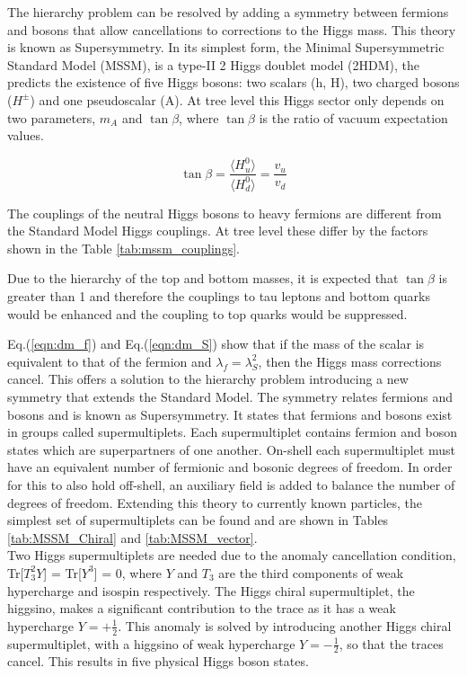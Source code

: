 The hierarchy problem can be resolved by adding a symmetry between fermions and bosons that allow cancellations to corrections to the Higgs mass. This theory is known as Supersymmetry. \cite{SUSY_Primer} In its simplest form, the Minimal Supersymmetric Standard Model (MSSM), is a type-II 2 Higgs doublet model (2HDM), the predicts the existence of five Higgs bosons: two scalars (h, H), two charged bosons (\(H^{\pm}\)) and one pseudoscalar (A). At tree level this Higgs sector only depends on two parameters, $m_A$ and $\tan\beta$, where $\tan\beta$ is the ratio of vacuum expectation values.

\begin{equation}
\tan \beta = \frac{\langle H_{u}^{0} \rangle}{\langle H_{d}^{0} \rangle} = \frac{v_{u}}{v_{d}}
\end{equation}

The couplings of the neutral Higgs bosons to heavy fermions are different from the Standard Model Higgs couplings. At tree level these differ by the factors shown in the Table \ref{tab:mssm_couplings}.


Due to the hierarchy of the top and bottom masses, it is expected that $\tan\beta$ is greater than 1 and therefore the couplings to tau leptons and bottom quarks would be enhanced and the coupling to top quarks would be suppressed.

Eq.(\ref{eqn:dm_f}) and Eq.(\ref{eqn:dm_S}) show that if the mass of the scalar is equivalent to that of the fermion and \(\lambda_f = \lambda_{S}^{2}\), then the Higgs mass corrections cancel. This offers a solution to the hierarchy problem introducing a new symmetry that extends the Standard Model. The symmetry relates fermions and bosons and is known as Supersymmetry. It states that fermions and bosons exist in groups called supermultiplets. Each supermultiplet contains fermion and boson states which are superpartners of one another. On-shell each supermultiplet must have an equivalent number of fermionic and bosonic degrees of freedom. In order for this to also hold off-shell, an auxiliary field is added to balance the number of degrees of freedom. Extending this theory to currently known particles, the simplest set of supermultiplets can be found and are shown in Tables \ref{tab:MSSM_Chiral} and \ref{tab:MSSM_vector}. \\

Two Higgs supermultiplets are needed due to the anomaly cancellation condition, Tr[\(T_{3}^{2}Y\)] = Tr[\(Y^3\)] = 0, where \(Y\) and \(T_3\) are the third components of weak hypercharge and isospin respectively. The Higgs chiral supermultiplet, the higgsino, makes a significant contribution to the trace as it has a weak hypercharge \(Y=+\frac{1}{2}\). This anomaly is solved by introducing another Higgs chiral supermultiplet, with a higgsino of weak hypercharge \(Y=-\frac{1}{2}\), so that the traces cancel. This results in five physical Higgs boson states. 

